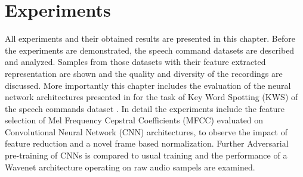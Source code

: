 
\chapter{Experiments}\label{sec:exp}
All experiments and their obtained results are presented in this chapter.
Before the experiments are demonstrated, the speech command datasets are described and analyzed.
Samples from those datasets with their feature extracted representation are shown and the quality and diversity of the recordings are discussed.
More importantly this chapter includes the evaluation of the neural network architectures presented in  for the task of Key Word Spotting (KWS) of the speech commands dataset \cite{Warden2018}.
In detail the experiments include the feature selection of Mel Frequency Cepstral Coefficients (MFCC) evaluated on Convolutional Neural Network (CNN) architectures, to observe the impact of feature reduction and a novel frame based normalization.
Further Adversarial pre-training of CNNs is compared to usual training and the performance of a Wavenet architecture operating on raw audio sampels are examined.











